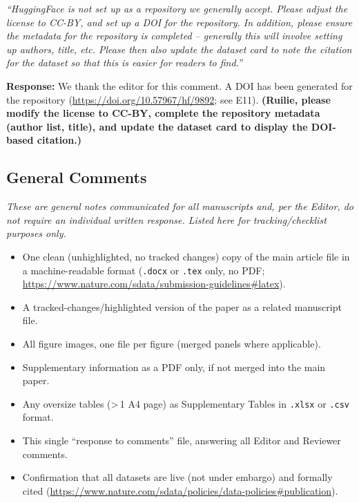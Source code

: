 \documentclass[11pt]{article}
\newcommand{\origcomment}[1]{\textit{``#1''}}
\newcommand{\filledresponse}[1]{%
  \par\medskip\noindent\textbf{Response:} #1\par
  \vspace{0.4cm}%
  \par\noindent\hrulefill\par\bigskip
}
\begin{document}
\begin{commentlist}
\item[E14.] \origcomment{HuggingFace is not set up as a repository we generally accept. Please
adjust the license to CC-BY, and set up a DOI for the repository. In addition, please ensure the
metadata for the repository is completed -- generally this will involve setting up authors,
title, etc. Please then also update the dataset card to note the citation for the dataset so that
this is easier for readers to find.}
\filledresponse{We thank the editor for this comment. A DOI has been generated for the repository (\url{https://doi.org/10.57967/hf/9892};
see E11). \textbf{(Ruilie, please modify the license to CC-BY, complete the repository metadata
(author list, title), and update the dataset card to display the DOI-based citation.)}}

\end{commentlist}

\subsection*{General Comments}
\noindent\textit{These are general notes communicated for all manuscripts and, per the Editor, do
not require an individual written response. Listed here for tracking/checklist purposes only.}

\begin{itemize}[itemsep=0.3em]
  \item One clean (unhighlighted, no tracked changes) copy of the main article file in a
  machine-readable format (\texttt{.docx} or \texttt{.tex} only, no PDF;
  \url{https://www.nature.com/sdata/submission-guidelines#latex}).
  \item [Optional] A tracked-changes/highlighted version of the paper as a related manuscript
  file.
  \item All figure images, one file per figure (merged panels where applicable).
  \item Supplementary information as a PDF only, if not merged into the main paper.
  \item Any oversize tables (\textgreater\,1 A4 page) as Supplementary Tables in \texttt{.xlsx} or
  \texttt{.csv} format.
  \item This single ``response to comments'' file, answering all Editor and Reviewer comments.
  \item Confirmation that all datasets are live (not under embargo) and formally cited
  (\url{https://www.nature.com/sdata/policies/data-policies#publication}).
\end{itemize}
\end{document}

